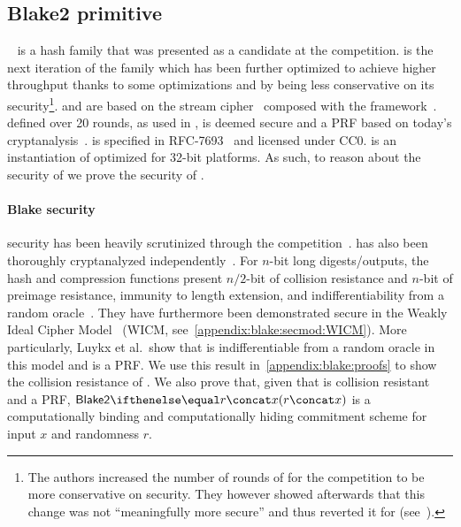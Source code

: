 \subsection{Blake2 primitive}\label{instantiation:prf-comm-crh:blake}

\blake{}{}~\cite{aumasson2008sha} is a hash family that was presented as a candidate at the  competition.  is the next iteration of the family which has been further optimized to achieve higher throughput thanks to some optimizations and by being less conservative on its security\footnote{The authors increased the number of rounds of \blake{}{} for the  competition to be more conservative on security. They however showed afterwards that this change was not ``meaningfully more secure'' and thus reverted it for  (see~\cite[Section 2.1]{aumasson2013blake2}).}. \blake{}{} and  are based on the \chacha{} stream cipher~\cite{bernstein2008chacha} composed with the \haifa{} framework~\cite{biham2007framework}. \chacha{} defined over 20 rounds, as used in , is deemed secure and a PRF based on today's cryptanalysis~\cite{procter2014security,choudhuri2016differential}.  is specified in RFC-7693~\cite{blakecompietf} and licensed under CC0.  is an instantiation of  optimized for 32-bit platforms. As such, to reason about the security of  we prove the security of .

\paragraph*{Blake security}

\blake{}{} security has been heavily scrutinized through the  competition~\cite{vidali2010collisions, ming2010security, andreeva2010security, alshaikhli2012comparison, andreeva2012security, andreeva2012provable, homsirikamol2012security}.  has also been thoroughly cryptanalyzed independently~\cite{guo2014analysis, hao2014boomerang, espitau2015higher, neves2019observation}. For $n$-bit long digests/outputs, the hash and compression functions present $n/2$-bit of collision resistance and $n$-bit of preimage resistance, immunity to length extension, and indifferentiability from a random oracle~\cite{aumasson2013blake2}. They have furthermore been demonstrated secure in the Weakly Ideal Cipher Model~\cite{luykx2016security} (WICM, see~\cref{appendix:blake:secmod:WICM}). More particularly, Luykx et al.~show that  is indifferentiable from a random oracle in this model and is a PRF.
We use this result in~\cref{appendix:blake:proofs} to show the collision resistance of . We also prove that, given that  is collision resistant and a PRF, $\blake{2}{r \concat x}$ is a computationally binding and computationally hiding commitment scheme for input $x$ and randomness $r$.

